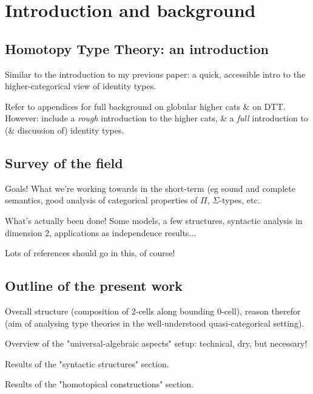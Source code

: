 

\chapter{Introduction and background}

\section{Homotopy Type Theory: an introduction}

\para Similar to the introduction to my previous paper: a quick, accessible intro to the higher-categorical view of identity types.

\para Refer to appendices for full background on globular higher cats \& on DTT.  However: include a \emph{rough} introduction to the higher cats, \& a \emph{full} introduction to (\& discussion of) identity types.

\section{Survey of the field}

\para Goals!  What we're working towards in the short-term (eg sound and complete semantics, good analysis of categorical properties of $\Pi$, $\Sigma$-types, etc.

\para What's actually been done!  Some models, a few structures, syntactic analysis in dimension 2, applications as independence results...

Lots of references should go in this, of course!

\section{Outline of the present work}

\para Overall structure (composition of 2-cells along bounding 0-cell), reason therefor (aim of analysing type theories in the well-understood quasi-categorical setting).

\para Overview of the "universal-algebraic aspects" setup: technical, dry, but necessary!

\para Results of the "syntactic structures" section.

\para Results of the "homotopical constructions" section.

